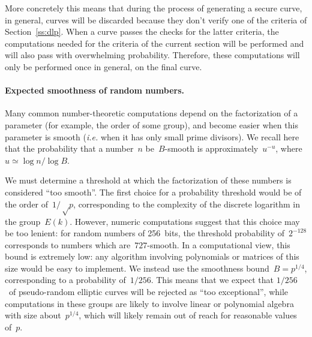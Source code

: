 \documentclass[twocolumn,letterpaper]{article}
\begin{document}
More concretely this means that during the process of generating
a secure curve, in general, curves will be discarded
because they don't verify one of the criteria of Section~\ref{ss:dlp}.
When a curve passes the checks for the latter criteria,
the computations needed for the criteria of the current section
will be performed and will also pass with overwhelming probability.
Therefore, these computations will only be performed once in general,
on the final curve.
\paragraph{Expected smoothness of random numbers.}%

Many common number-theoretic computations depend on
the factorization of a parameter (for example, the order of some group),
and become easier when this parameter is smooth
(\emph{i.e.} when it has only small prime divisors).
We recall here~\cite{jnt1983cep} that the probability that
a number~$n$ be~$B$-smooth is approximately~$u^{-u}$,
where $u ≃ \log n / \log B$.

We must determine a threshold at which the factorization of these
numbers is considered ``too smooth''.
The first choice for a probability threshold would be
of the order of~$1/√p$, corresponding to the complexity of
the discrete logarithm in the group~$E(k)$.
However, numeric computations suggest that this choice may be too lenient:
for random numbers of 256~bits, the threshold probability of~$2^{-128}$
corresponds to numbers which are~$727$-smooth.
In a computational view, this bound is extremely low:
any algorithm involving polynomials or matrices of this size
would be easy to implement.
We instead use the smoothness bound~$B = p^{1/4}$,
corresponding to a probability of~$1/256$.
This means that we expect that $1/256$~of pseudo-random elliptic curves
will be rejected as ``too exceptional'',
while computations in these groups
are likely to involve linear or polynomial algebra
with size about~$p^{1/4}$,
which will likely remain out of reach for reasonable values of~$p$.

\end{document}
